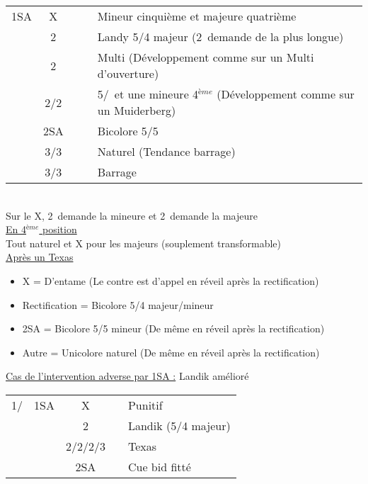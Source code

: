 \documentclass[a4paper, oneside, 11pt]{report}
\begin{document}
	\begin{tabular}{cccc|l}
	1SA & X &&& Mineur cinquième et majeure quatrième\\
	& 2\trefle &&& Landy 5/4 majeur (2\carreau\ demande de la plus longue)\\
	& 2\carreau &&& Multi (Développement comme sur un Multi d'ouverture)\\
	& 2\coeur/2\pique &&& 5\coeur/\pique\ et une mineure 4$^{ème}$ (Développement comme sur un Muiderberg)\\
	& 2SA &&& Bicolore 5\trefle/5\carreau\\
	& 3\trefle/3\carreau &&& Naturel (Tendance barrage)\\
	& 3\coeur/3\pique &&& Barrage\\
	\end{tabular}\\
	Sur le X, 2\trefle\ demande la mineure et 2\carreau\ demande la majeure\\
	
	\underline{En 4$^{ème}$ position}\\
	Tout naturel et X pour les majeurs (souplement transformable)\\

	\underline{Après un Texas}
	
	\begin{itemize}
	\item X = D'entame (Le contre est d'appel en réveil après la rectification)
	\item Rectification = Bicolore 5/4 majeur/mineur
	\item 2SA = Bicolore 5/5 mineur (De même en réveil après la rectification)
	\item Autre = Unicolore naturel (De même en réveil après la rectification)\\
	\end{itemize}

	\underline{Cas de l'intervention adverse par 1SA :} Landik amélioré\\
	\begin{tabular}{cccc|l}
	1\trefle/\carreau & 1SA & X && Punitif\\
	&& 2\trefle && Landik (5/4 majeur)\\
	&& 2\carreau/2\coeur/2\pique/3\trefle && Texas\\
	&& 2SA && Cue bid fitté\\
	\end{tabular}\\\\
\end{document}
